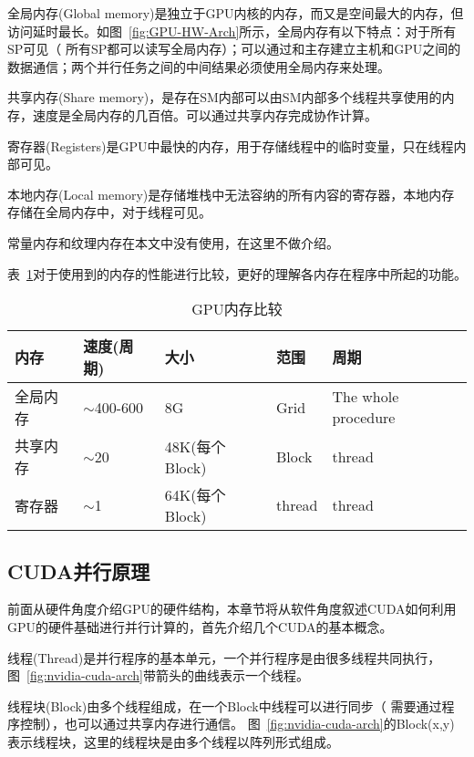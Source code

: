 全局内存(Global  memory)是独立于GPU内核的内存，而又是空间最大的内存，但访问延时最长。如图~\ref{fig:GPU-HW-Arch}所示，全局内存有以下特点：对于所有SP可见（ 所有SP都可以读写全局内存）；可以通过和主存建立主机和GPU之间的数据通信；两个并行任务之间的中间结果必须使用全局内存来处理。

共享内存(Share memory)，是存在SM内部可以由SM内部多个线程共享使用的内存，速度是全局内存的几百倍。可以通过共享内存完成协作计算。

寄存器(Registers)是GPU中最快的内存，用于存储线程中的临时变量，只在线程内部可见。

本地内存(Local memory)是存储堆栈中无法容纳的所有内容的寄存器，本地内存存储在全局内存中，对于线程可见。

常量内存和纹理内存在本文中没有使用，在这里不做介绍。

表~\ref{tab:memory}对于使用到的内存的性能进行比较，更好的理解各内存在程序中所起的功能。

\begin{table}[htbp]
	\centering
	\begin{minipage}{0.7\textwidth}
		\caption{GPU内存比较}
		\label{tab:memory}
		\begin{tabular}{p{2cm}p{2cm}p{2cm}p{2cm}p{2cm}}
			\toprule[1.5pt]
			{\heiti 内存} & {\heiti 速度}(周期)&{\heiti 大小} &{\heiti 范围} &{\heiti 周期}\\\midrule[1pt]
			全局内存 & $\sim$400-600 & 8G & Grid & The whole procedure \\
			共享内存 & $\sim$20 & 48K(每个Block) & Block & thread \\
			寄存器 & $\sim$1 & 64K(每个Block) & thread & thread \\
			\bottomrule[1.5pt]
		\end{tabular}
		
	\end{minipage}
\end{table}

\subsection{CUDA并行原理}

前面从硬件角度介绍GPU的硬件结构，本章节将从软件角度叙述CUDA如何利用GPU的硬件基础进行并行计算的，首先介绍几个CUDA的基本概念。

线程(Thread)是并行程序的基本单元，一个并行程序是由很多线程共同执行，图~\ref{fig:nvidia-cuda-arch}带箭头的曲线表示一个线程。

线程块(Block)由多个线程组成，在一个Block中线程可以进行同步（ 需要通过程序控制），也可以通过共享内存进行通信。 图~\ref{fig:nvidia-cuda-arch}的Block(x,y)表示线程块，这里的线程块是由多个线程以阵列形式组成。

